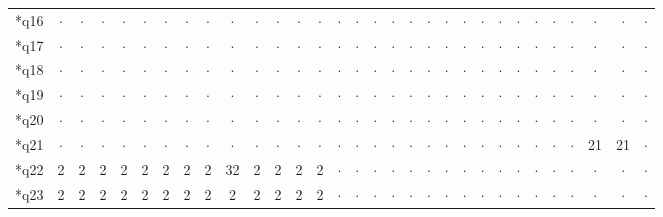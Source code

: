 \begin{longtable}{l|cccccccccccccccccccccccccccccc}
*q16 & $\cdot$ & $\cdot$ & $\cdot$ & $\cdot$ & $\cdot$ & $\cdot$ & $\cdot$ & $\cdot$ & $\cdot$ & $\cdot$ & $\cdot$ & $\cdot$ & $\cdot$ & $\cdot$ & $\cdot$ & $\cdot$ & $\cdot$ & $\cdot$ & $\cdot$ & $\cdot$ & $\cdot$ & $\cdot$ & $\cdot$ & $\cdot$ & $\cdot$ & $\cdot$ & $\cdot$ & $\cdot$ & $\cdot$ & $\cdot$ \\
*q17 & $\cdot$ & $\cdot$ & $\cdot$ & $\cdot$ & $\cdot$ & $\cdot$ & $\cdot$ & $\cdot$ & $\cdot$ & $\cdot$ & $\cdot$ & $\cdot$ & $\cdot$ & $\cdot$ & $\cdot$ & $\cdot$ & $\cdot$ & $\cdot$ & $\cdot$ & $\cdot$ & $\cdot$ & $\cdot$ & $\cdot$ & $\cdot$ & $\cdot$ & $\cdot$ & $\cdot$ & $\cdot$ & $\cdot$ & $\cdot$ \\
*q18 & $\cdot$ & $\cdot$ & $\cdot$ & $\cdot$ & $\cdot$ & $\cdot$ & $\cdot$ & $\cdot$ & $\cdot$ & $\cdot$ & $\cdot$ & $\cdot$ & $\cdot$ & $\cdot$ & $\cdot$ & $\cdot$ & $\cdot$ & $\cdot$ & $\cdot$ & $\cdot$ & $\cdot$ & $\cdot$ & $\cdot$ & $\cdot$ & $\cdot$ & $\cdot$ & $\cdot$ & $\cdot$ & $\cdot$ & $\cdot$ \\
*q19 & $\cdot$ & $\cdot$ & $\cdot$ & $\cdot$ & $\cdot$ & $\cdot$ & $\cdot$ & $\cdot$ & $\cdot$ & $\cdot$ & $\cdot$ & $\cdot$ & $\cdot$ & $\cdot$ & $\cdot$ & $\cdot$ & $\cdot$ & $\cdot$ & $\cdot$ & $\cdot$ & $\cdot$ & $\cdot$ & $\cdot$ & $\cdot$ & $\cdot$ & $\cdot$ & $\cdot$ & $\cdot$ & $\cdot$ & $\cdot$ \\
*q20 & $\cdot$ & $\cdot$ & $\cdot$ & $\cdot$ & $\cdot$ & $\cdot$ & $\cdot$ & $\cdot$ & $\cdot$ & $\cdot$ & $\cdot$ & $\cdot$ & $\cdot$ & $\cdot$ & $\cdot$ & $\cdot$ & $\cdot$ & $\cdot$ & $\cdot$ & $\cdot$ & $\cdot$ & $\cdot$ & $\cdot$ & $\cdot$ & $\cdot$ & $\cdot$ & $\cdot$ & $\cdot$ & $\cdot$ & $\cdot$ \\
*q21 & $\cdot$ & $\cdot$ & $\cdot$ & $\cdot$ & $\cdot$ & $\cdot$ & $\cdot$ & $\cdot$ & $\cdot$ & $\cdot$ & $\cdot$ & $\cdot$ & $\cdot$ & $\cdot$ & $\cdot$ & $\cdot$ & $\cdot$ & $\cdot$ & $\cdot$ & $\cdot$ & $\cdot$ & $\cdot$ & $\cdot$ & $\cdot$ & $\cdot$ & $\cdot$ & $\cdot$ & 21 & 21 & $\cdot$ \\
*q22 & 2 & 2 & 2 & 2 & 2 & 2 & 2 & 2 & 32 & 2 & 2 & 2 & 2 & $\cdot$ & $\cdot$ & $\cdot$ & $\cdot$ & $\cdot$ & $\cdot$ & $\cdot$ & $\cdot$ & $\cdot$ & $\cdot$ & $\cdot$ & $\cdot$ & $\cdot$ & $\cdot$ & $\cdot$ & $\cdot$ & $\cdot$ \\
*q23 & 2 & 2 & 2 & 2 & 2 & 2 & 2 & 2 & 2 & 2 & 2 & 2 & 2 & $\cdot$ & $\cdot$ & $\cdot$ & $\cdot$ & $\cdot$ & $\cdot$ & $\cdot$ & $\cdot$ & $\cdot$ & $\cdot$ & $\cdot$ & $\cdot$ & $\cdot$ & $\cdot$ & $\cdot$ & $\cdot$ & $\cdot$ \\

\end{longtable}
